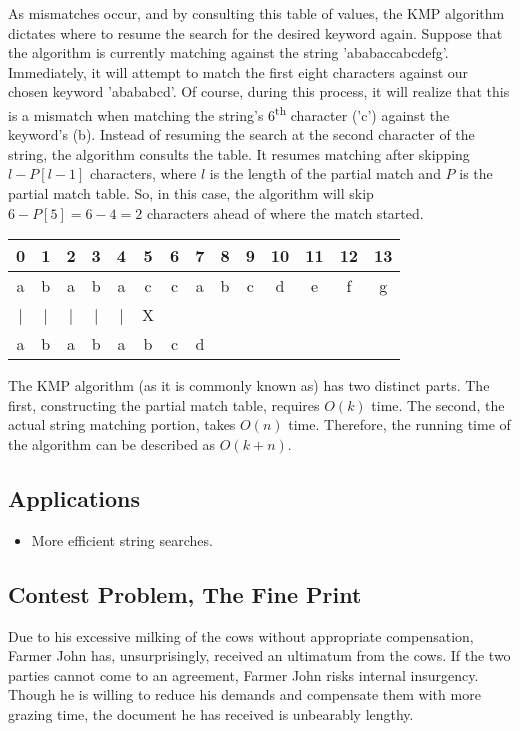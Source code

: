 As mismatches occur, and by consulting this table of values, the KMP algorithm dictates where to resume the search for the desired keyword again.
Suppose that the algorithm is currently matching against the string 'ababaccabcdefg'.
Immediately, it will attempt to match the first eight characters against our chosen keyword 'abababcd'.
Of course, during this process, it will realize that this is a mismatch when matching the string's 6\textsuperscript{th} character ('c') against the keyword's (b).
Instead of resuming the search at the second character of the string, the algorithm consults the table.
It resumes matching after skipping $l - P[l - 1]$ characters, where $l$ is the length of the partial match and $P$ is the partial match table.
So, in this case, the algorithm will skip $6 - P[5] = 6 - 4 = 2$ characters ahead of where the match started.

\begin{center}
	\begin{tabular}{ | c | c | c | c | c | c | c | c | c | c | c | c | c | c | }
		\hline
		0 & 1 & 2 & 3 & 4 & 5 & 6 & 7 & 8 & 9 & 10 & 11 & 12 & 13 \\ \hline
		a & b & a & b & a & c & c & a & b & c & d & e & f & g \\ \hline
		| & | & | & | & | & X &   &   &   &   &   &   &   &   \\ \hline
		a & b & a & b & a & b & c & d &   &   &   &   &   &   \\ \hline

	\end{tabular}
\end{center}

The KMP algorithm (as it is commonly known as) has two distinct parts.
The first, constructing the partial match table, requires $O(k)$ time.
The second, the actual string matching portion, takes $O(n)$ time.
Therefore, the running time of the algorithm can be described as $O(k + n)$.

\subsection{Applications}
\begin{itemize}
	\item More efficient string searches.
\end{itemize}

\subsection{Contest Problem, The Fine Print}
Due to his excessive milking of the cows without appropriate compensation, Farmer John has, unsurprisingly, received an ultimatum from the cows.
If the two parties cannot come to an agreement, Farmer John risks internal insurgency.
Though he is willing to reduce his demands and compensate them with more grazing time, the document he has received is unbearably lengthy.

